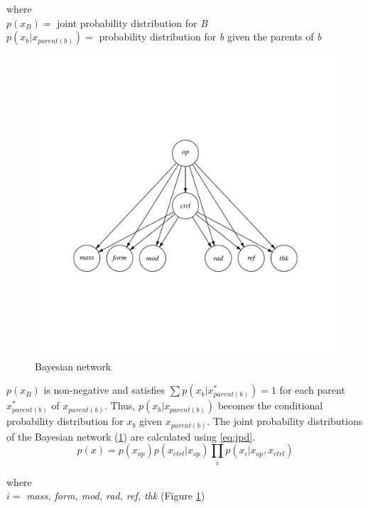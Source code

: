 \noindent where \\
\indent $p(x_{B}) = $ joint probability distribution for \textit{B} \\
\indent $p(x_{b} | x_{parent(b)}) = $ probability distribution for \textit{b} given the parents of \textit{b} \\
%
\begin{figure}
  \centering
  \includegraphics[trim={1cm 4.8cm 1cm 4.8cm}, width=\textwidth]{figures/bn.pdf}
  \caption{Bayesian network}
  \label{fig:bn1}
\end{figure}

\noindent $p(x_{B})$ is non-negative and satisfies $\sum p(x_{b} | x_{parent(b)}^{*}) = 1$ for each parent $x_{parent(b)}^{*}$ of $x_{parent(b)}$.
Thus, $p(x_{b} | x_{parent(b)})$ becomes the conditional probability distribution for $x_{b}$ given $x_{parent(b)}$.
The joint probability distributions of the Bayesian network (\ref{fig:bn1}) are calculated using \ref{eq:jpd}.
%
\begin{equation}
  \label{eq:jpd}
  p(x) = p(x_{op}) p(x_{ctrl} | x_{op}) \prod_{i} p(x_{i} | x_{op}, x_{ctrl})
\end{equation}

\noindent where \\
\indent $i = $ \textit{mass, form, mod, rad, ref, thk} (Figure \ref{fig:bn1}) \\

